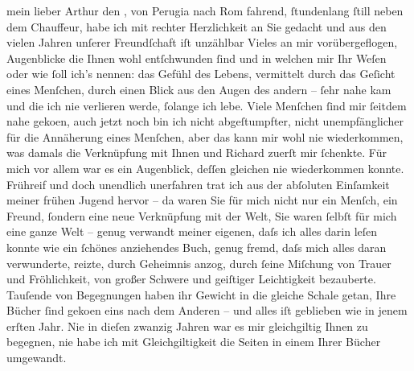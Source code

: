 \pstart{}mein lieber Arthur\pend\vspace{0.5em}
\pstart
           den \label{K_L02074-1v}\label{K_L02074-1}, von Perugia nach Rom fahrend, ſtundenlang ſtill neben dem Chauffeur, habe ich mit rechter Herzlichkeit an Sie gedacht
               und aus den vielen Jahren unſerer Freundſchaft iſt unzählbar Vieles an mir
               vorübergeflogen, Augenblicke die Ihnen wohl entſchwunden ſind und in welchen mir Ihr
               Weſen oder wie ſoll ich’s nennen: das Gefühl des Lebens, vermittelt durch das Geſicht
               eines Menſchen, durch einen Blick aus den Augen des andern – ſehr nahe kam und die
               ich nie verlieren werde, ſolange ich lebe. Viele Menſchen ſind mir ſeitdem nahe
                  geko{\geminationm}en, auch jetzt noch bin ich nicht abgeſtumpfter,
               nicht unempfänglicher für die Annäherung eines Menſchen, aber das kann mir wohl nie
               wiederkommen, was damals die Verknüpfung mit Ihnen und Richard zuerſt mir ſchenkte. Für mich \introOben{}vor
                     allem\introOben{} war es ein Augenblick, deſſen {\pb}gleichen
               nie wiederkommen konnte. Frühreif und doch unendlich unerfahren trat ich aus der
               abſoluten Einſamkeit meiner frühen Jugend hervor – da waren Sie für mich nicht nur
               ein Menſch, ein Freund, ſondern eine neue Verknüpfung mit der Welt, Sie waren ſelbſt
               für mich eine ganze Welt –  genug verwandt meiner
               eigenen, daſs ich alles darin leſen konnte wie ein ſchönes anziehendes Buch, genug
               fremd, daſs mich alles daran verwunderte, reizte, durch Geheimnis anzog, durch ſeine
               Miſchung von Trauer und Fröhlichkeit, von großer Schwere und geiſtiger Leichtigkeit
               bezauberte. Tauſende von Begegnungen haben ihr Gewicht in die gleiche Schale getan,
               Ihre Bücher ſind geko{\geminationm}en eins nach dem Anderen – und
               alles iſt geblieben wie in jenem erſten Jahr. Nie in dieſen zwanzig Jahren war es mir
               gleichgiltig Ihnen zu begegnen, nie habe ich mit Gleichgiltigkeit die Seiten in einem
               Ihrer Bücher umgewandt.\pend
           
